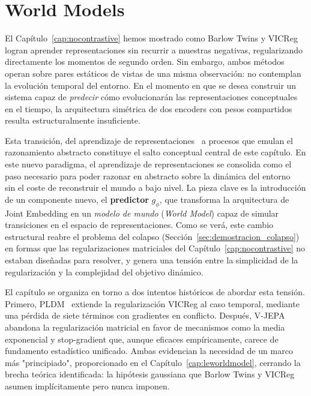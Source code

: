 \chapter{World Models}
\label{cap:modelos_mundo}

El Capítulo~\ref{cap:nocontrastive} hemos mostrado como Barlow Twins y VICReg logran aprender representaciones sin recurrir a muestras negativas, regularizando directamente los momentos de segundo orden. Sin embargo, ambos métodos operan sobre pares estáticos de vistas de una misma observación: no contemplan la evolución temporal del entorno. En el momento en que se desea construir un sistema capaz de \emph{predecir} cómo evolucionarán las representaciones conceptuales en el tiempo, la arquitectura simétrica de dos encoders con pesos compartidos resulta estructuralmente insuficiente.

Esta transición, del aprendizaje de representaciones~\cite{bengio2013representation} a procesos que emulan el razonamiento abstracto constituye el salto conceptual central de este capítulo. En este nuevo paradigma, el aprendizaje de representaciones se consolida como el paso necesario para poder razonar en abstracto sobre la dinámica del entorno~\cite{lecun2022path, lecun2025objectives} sin el coste de reconstruir el mundo a bajo nivel. La pieza clave es la introducción de un componente nuevo, el \textbf{predictor} $g_\phi$, que transforma la arquitectura de Joint Embedding en un \emph{modelo de mundo} (\textit{World Model}) capaz de simular transiciones en el espacio de representaciones. Como se verá, este cambio estructural reabre el problema del colapso (Sección~\ref{sec:demostracion_colapso}) en formas que las regularizaciones matriciales del Capítulo~\ref{cap:nocontrastive} no estaban diseñadas para resolver, y genera una tensión entre la simplicidad de la regularización y la complejidad del objetivo dinámico.

El capítulo se organiza en torno a dos intentos históricos de abordar esta tensión. Primero, PLDM~\cite{sobal2022joint} extiende la regularización VICReg al caso temporal, mediante una pérdida de siete términos con gradientes en conflicto. Después, V-JEPA~\cite{assran2023self} abandona la regularización matricial en favor de mecanismos como la media exponencial y stop-gradient que, aunque eficaces empíricamente, carece de fundamento estadístico unificado. Ambas evidencian la necesidad de un marco más "principiado", proporcionado en el Capítulo~\ref{cap:leworldmodel}, cerrando la brecha teórica identificada: la hipótesis gaussiana que Barlow Twins y VICReg asumen implícitamente pero nunca imponen.

